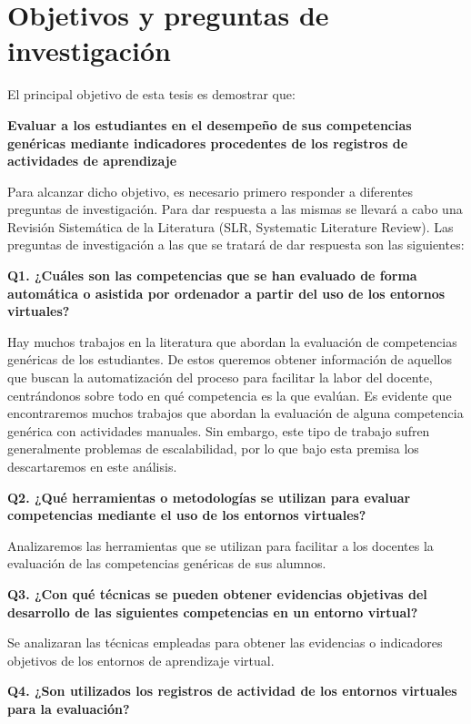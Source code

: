 
\section{Objetivos y preguntas de investigación}
\label{sec:objetivos}

El principal objetivo de esta tesis es demostrar que:

\bigskip
\textbf{Evaluar a los estudiantes en el desempeño de sus competencias genéricas mediante indicadores procedentes de los registros de actividades de aprendizaje}
\bigskip

Para alcanzar dicho objetivo, es necesario primero responder a diferentes preguntas de investigación. Para dar respuesta a las mismas se llevará a cabo una Revisión Sistemática de la Literatura (SLR, Systematic Literature Review). Las preguntas de investigación a las que se tratará de dar respuesta son las siguientes:

\bigskip
\textbf{Q1. ¿Cuáles son las competencias que se han evaluado de forma automática o asistida por ordenador a partir del uso de los entornos virtuales?}
\bigskip

Hay muchos trabajos en la literatura que abordan la evaluación de competencias genéricas de los estudiantes. De estos queremos obtener información de aquellos que buscan la automatización del proceso para facilitar la labor del docente, centrándonos sobre todo en qué competencia es la que evalúan. Es evidente que encontraremos muchos trabajos que abordan la evaluación de alguna competencia genérica con actividades manuales. Sin embargo, este tipo de trabajo sufren generalmente problemas de escalabilidad, por lo que bajo esta premisa los descartaremos en este análisis.

\bigskip
\textbf{Q2. ¿Qué herramientas o metodologías se utilizan para evaluar competencias mediante el uso de los entornos virtuales?}
\bigskip

Analizaremos las herramientas que se utilizan para facilitar a los docentes la evaluación de las competencias genéricas de sus alumnos.

\bigskip
\textbf{Q3. ¿Con qué técnicas se pueden obtener evidencias objetivas del desarrollo de las siguientes competencias en un entorno virtual?}
\bigskip

Se analizaran las técnicas empleadas para obtener las evidencias o indicadores objetivos de los entornos de aprendizaje virtual.

\bigskip
\textbf{Q4. ¿Son utilizados los registros de actividad de los entornos virtuales para la evaluación?}
\bigskip

